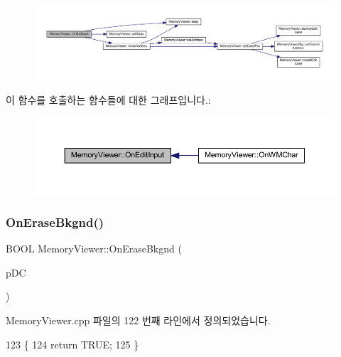 \nopagebreak
\begin{figure}[H]
\begin{center}
\leavevmode
\includegraphics[width=350pt]{class_memory_viewer_ab3cf8e1e2318a15b1e7c783b9a7bad80_cgraph}
\end{center}
\end{figure}
이 함수를 호출하는 함수들에 대한 그래프입니다.\+:
\nopagebreak
\begin{figure}[H]
\begin{center}
\leavevmode
\includegraphics[width=350pt]{class_memory_viewer_ab3cf8e1e2318a15b1e7c783b9a7bad80_icgraph}
\end{center}
\end{figure}
\mbox{\label{class_memory_viewer_a4526960fde4490046ce584462eb26dcb}} 
\subsubsection{\texorpdfstring{On\+Erase\+Bkgnd()}{OnEraseBkgnd()}}
{\footnotesize\ttfamily B\+O\+OL Memory\+Viewer\+::\+On\+Erase\+Bkgnd (\begin{DoxyParamCaption}\item[{C\+DC $\ast$}]{p\+DC }\end{DoxyParamCaption})\hspace{0.3cm}{\ttfamily [protected]}}



Memory\+Viewer.\+cpp 파일의 122 번째 라인에서 정의되었습니다.


\begin{DoxyCode}
123 \{
124   \textcolor{keywordflow}{return} TRUE;
125 \}
\end{DoxyCode}
\mbox{\label{class_memory_viewer_ab33125683b4ca8997d8dda88835512ff}} 
